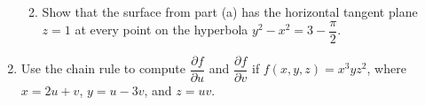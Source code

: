 \documentclass[12pt]{article}
\newcommand{\points}[1]{\marginpar{\hspace{24pt}[#1]}}
\begin{document}
\begin{enumerate}
\begin{enumerate}
\vspace{2.75in}

\item Show that the surface from part (a) has the horizontal tangent plane $z=1$ at every point on the hyperbola $y^2-x^2 = 3-\dfrac{\pi}{2}$. \points{2}

\vspace{1.7in}
\end{enumerate} 



\item Use the chain rule to compute $\dfrac{\partial f}{\partial u}$ and $\dfrac{\partial f}{\partial v}$ if $f(x,y,z) = x^3yz^2$, where $x = 2u+v$, $y=u-3v$, and $z=uv$. \points{5}
\end{enumerate}
\end{document}
